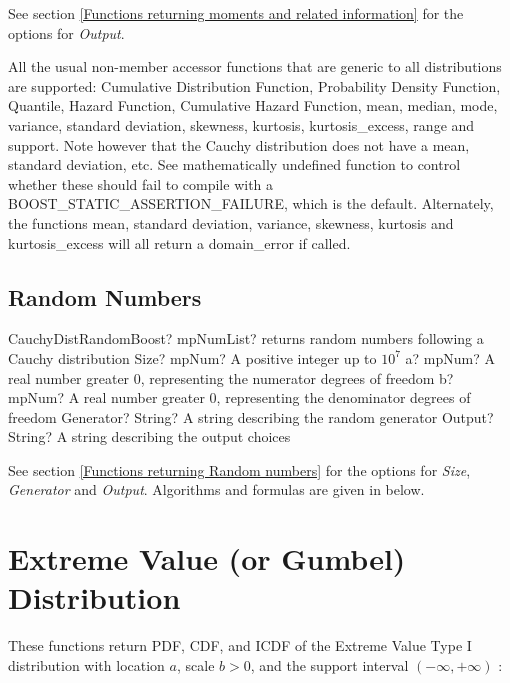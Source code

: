 \vspace{0.3cm}

See section \ref{Functions returning moments and related information} for the options for {\itshape\sffamily Output}. 

All the usual non-member accessor functions that are generic to all distributions are supported: Cumulative Distribution Function,
Probability Density Function, Quantile, Hazard Function, Cumulative Hazard Function, mean, median, mode, variance, standard
deviation, skewness, kurtosis, kurtosis\_excess, range and support.
Note however that the Cauchy distribution does not have a mean, standard deviation, etc. See mathematically undefined function  to
control whether these should fail to compile with a BOOST\_STATIC\_ASSERTION\_FAILURE, which is the default.
Alternately, the functions mean, standard deviation, variance, skewness, kurtosis and kurtosis\_excess will all return a domain\_error
if called.



\subsection{Random Numbers}
\begin{mpFunctionsExtract}
	\mpFunctionFive
	{CauchyDistRandomBoost? mpNumList? returns random numbers following a Cauchy distribution}
	{Size? mpNum? A positive integer up to $10^7$}
	{a? mpNum? A real number greater 0, representing the numerator  degrees of freedom}
	{b? mpNum? A real number greater 0, representing the denominator degrees of freedom}
	{Generator? String? A string describing the random generator}
	{Output? String? A string describing the output choices}
\end{mpFunctionsExtract}

\vspace{0.3cm}

See section \ref{Functions returning Random numbers} for the options for  {\itshape\sffamily Size},  {\itshape\sffamily Generator} and {\itshape\sffamily Output}. Algorithms and formulas are given in below.





\section{Extreme Value (or Gumbel) Distribution}

These functions return PDF, CDF, and ICDF of the Extreme Value Type I distribution
with location $a$, scale $b > 0$, and the support interval $(-\infty,+\infty)$ :



